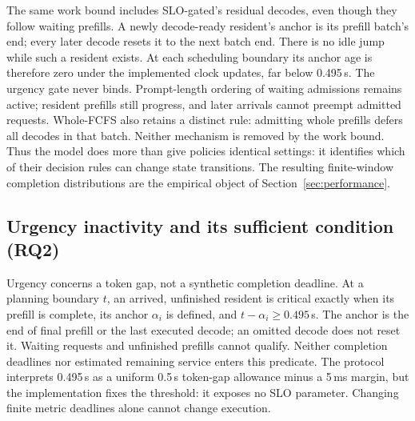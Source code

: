 The same work bound includes SLO-gated's residual decodes, even though they
follow waiting prefills. A newly decode-ready resident's anchor is its
prefill batch's end; every later decode resets it to the next batch end.
There is no idle jump while such a resident exists. At each scheduling
boundary its anchor age is therefore zero under the implemented clock
updates, far below 0.495\,s. The urgency gate never binds. Prompt-length
ordering of waiting admissions remains active; resident prefills still
progress, and later arrivals cannot preempt admitted requests. Whole-FCFS
also retains a distinct rule: admitting whole prefills defers all decodes
in that batch. Neither mechanism is removed by the work bound. Thus the model does more
than give policies identical settings: it identifies which of their decision
rules can change state transitions. The resulting finite-window completion
distributions are the empirical object of Section~\ref{sec:performance}.

\subsection{Urgency inactivity and its sufficient condition (RQ2)}\label{sec:urgency}
Urgency concerns a token gap, not a synthetic completion deadline. At a
planning boundary $t$, an arrived, unfinished resident is critical exactly
when its prefill is complete, its anchor $\alpha_i$ is defined, and
$t-\alpha_i\geq0.495$\,s. The anchor is the end of final prefill or the last
executed decode; an omitted decode does not reset it. Waiting requests and
unfinished prefills cannot qualify. Neither completion deadlines nor
estimated remaining service enters this predicate. The protocol interprets
0.495\,s as a uniform 0.5\,s token-gap allowance minus a 5\,ms margin, but
the implementation fixes the threshold: it exposes no SLO parameter.
Changing finite metric deadlines alone cannot change execution.

